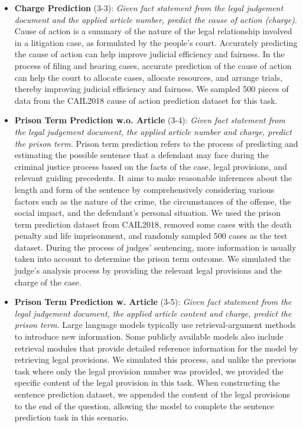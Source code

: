 \begin{itemize}
    \item \textbf{Charge Prediction} (3-3): \emph{Given fact statement from the legal judgement document and the applied article number, predict the cause of action (charge)}.
Cause of action is a summary of the nature of the legal relationship involved in a litigation case, as formulated by the people's court. Accurately predicting the cause of action can help improve judicial efficiency and fairness. In the process of filing and hearing cases, accurate prediction of the cause of action can help the court to allocate cases, allocate resources, and arrange trials, thereby improving judicial efficiency and fairness. 
We sampled 500 pieces of data from the CAIL2018 cause of action prediction dataset for this task.
    \item \textbf{Prison Term Prediction w.o. Article} (3-4): \emph{Given fact statement from the legal judgement document, the applied article number and charge, predict the prison term.}
Prison term prediction refers to the process of predicting and estimating the possible sentence that a defendant may face during the criminal justice process based on the facts of the case, legal provisions, and relevant guiding precedents. It aims to make reasonable inferences about the length and form of the sentence by comprehensively considering various factors such as the nature of the crime, the circumstances of the offense, the social impact, and the defendant's personal situation. 
We used the prison term prediction dataset from CAIL2018, removed some cases with the death penalty and life imprisonment, and randomly sampled 500 cases as the test dataset. During the process of judges' sentencing, more information is usually taken into account to determine the prison term outcome. We simulated the judge's analysis process by providing the relevant legal provisions and the charge of the case.
    \item \textbf{Prison Term Prediction w. Article} (3-5):
\emph{Given fact statement from the legal judgement document, the applied article content and charge, predict the prison term.}
Large language models typically use retrieval-argument methods to introduce new information. Some publicly available models also include retrieval modules that provide detailed reference information for the model by retrieving legal provisions. We simulated this process, and unlike the previous task where only the legal provision number was provided, we provided the specific content of the legal provision in this task. When constructing the sentence prediction dataset, we appended the content of the legal provisions to the end of the question, allowing the model to complete the sentence prediction task in this scenario.

\end{itemize}
